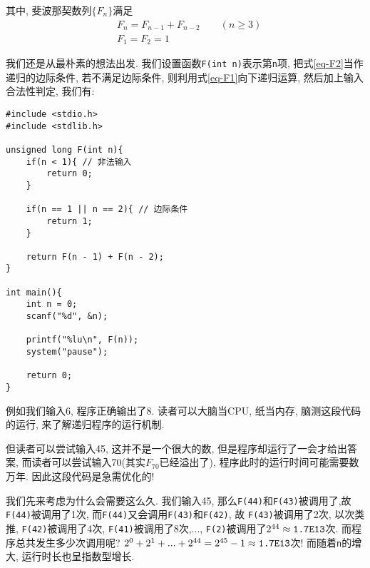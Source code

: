         其中, 斐波那契数列$\{F_n\}$满足
        \begin{align}
            &F_n = F_{n-1} + F_{n-2} \qquad (n \geq 3) \tag{1} \label{eq-F1} \\
            &F_1 = F_2 = 1 \tag{2} \label{eq-F2}
        \end{align}

        我们还是从最朴素的想法出发. 我们设置函数\texttt{F(int n)}表示第\texttt{n}项, 把式\ref{eq-F2}当作递归的边际条件, 若不满足边际条件, 则利用式\ref{eq-F1}向下递归运算, 然后加上输入合法性判定, 我们有:
\begin{lstlisting}
#include <stdio.h>
#include <stdlib.h>

unsigned long F(int n){
    if(n < 1){ // 非法输入
        return 0;
    }

    if(n == 1 || n == 2){ // 边际条件
        return 1;
    }

    return F(n - 1) + F(n - 2);
}

int main(){
    int n = 0;
    scanf("%d", &n);

    printf("%lu\n", F(n));
    system("pause");

    return 0;
}
\end{lstlisting}

        例如我们输入6, 程序正确输出了8. 读者可以大脑当CPU, 纸当内存, 脑测这段代码的运行, 来了解递归程序的运行机制.

        但读者可以尝试输入45, 这并不是一个很大的数, 但是程序却运行了一会才给出答案, 而读者可以尝试输入70(其实$F_70$已经溢出了), 程序此时的运行时间可能需要数万年. 因此这段代码是急需优化的!

        我们先来考虑为什么会需要这么久. 我们输入45, 那么\texttt{F(44)}和\texttt{F(43)}被调用了,故 \texttt{F(44)}被调用了1次, 而\texttt{F(44)}又会调用\texttt{F(43)}和\texttt{F(42)}, 故 \texttt{F(43)}被调用了2次, 以次类推, \texttt{F(42)}被调用了4次, \texttt{F(41)}被调用了8次,..., \texttt{F(2)}被调用了$2^{44} \approx \mbox{\texttt{1.7E13}}$次. 而程序总共发生多少次调用呢? $2^0 + 2^1 + ... + 2^{44} = 2^{45} - 1 \approx \mbox{\texttt{1.7E13}}$次! 而随着\texttt{n}的增大, 运行时长也呈指数型增长.


